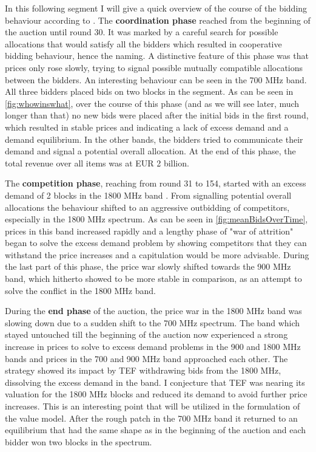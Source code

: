 In this following segment I will give a quick overview of the course of the bidding behaviour according to \citeauthor{Bichler2016}. The \textbf{coordination phase} reached from the beginning of the auction until round 30. It was marked by a careful search for possible allocations that would satisfy all the bidders which resulted in cooperative bidding behaviour, hence the naming. A distinctive feature of this phase was that prices only rose slowly, trying to signal possible mutually compatible allocations between the bidders. An interesting behaviour can be seen in the 700 MHz band. All three bidders placed bids on two blocks in the segment. As can be seen in \autoref{fig:whowinswhat}, over the course of this phase (and as we will see later, much longer than that) no new bids were placed after the initial bids in the first round, which resulted in stable prices and indicating a lack of excess demand and a demand equilibrium. In the other bands, the bidders tried to communicate their demand and signal a potential overall allocation. At the end of this phase, the total revenue over all items was at EUR 2 billion.

The \textbf{competition phase}, reaching from round 31 to 154, started with an excess demand of 2 blocks in the 1800 MHz band \cite{Bichler2016}. From signalling potential overall allocations the behaviour shifted to an aggressive outbidding of competitors, especially in the 1800 MHz spectrum. As can be seen in \autoref{fig:meanBidsOverTime}, prices in this band increased rapidly and a lengthy phase of "war of attrition" began to solve the excess demand problem by showing competitors that they can withstand the price increases and a capitulation would be more advisable. During the last part of this phase, the price war slowly shifted towards the 900 MHz band, which hitherto showed to be more stable in comparison, as an attempt to solve the conflict in the 1800 MHz band.

During the \textbf{end phase} of the auction, the price war in the 1800 MHz band was slowing down due to a sudden shift to the 700 MHz spectrum. The band which stayed untouched till the beginning of the auction now experienced a strong increase in prices to solve to excess demand problems in the 900 and 1800 MHz bands and prices in the 700 and 900 MHz band approached each other. The strategy showed its impact by TEF withdrawing bids from the 1800 MHz, dissolving the excess demand in the band. I conjecture that TEF was nearing its valuation for the 1800 MHz blocks and reduced its demand to avoid further price increases. This is an interesting point that will be utilized in the formulation of the value model. After the rough patch in the 700 MHz band it returned to an equilibrium that had the same shape as in the beginning of the auction and each bidder won two blocks in the spectrum.

